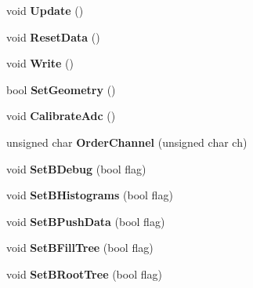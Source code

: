 \begin{DoxyCompactItemize}
\item 
\hypertarget{classCalibrator_a222509c611b01d1a77d0660973871067}{void {\bfseries Update} ()}\label{classCalibrator_a222509c611b01d1a77d0660973871067}

\item 
\hypertarget{classCalibrator_adc2c0c66462d79f9de57d4284ef3fd8d}{void {\bfseries Reset\-Data} ()}\label{classCalibrator_adc2c0c66462d79f9de57d4284ef3fd8d}

\item 
\hypertarget{classCalibrator_aa9d8bfddbfb414a3a6586d6a04558aa0}{void {\bfseries Write} ()}\label{classCalibrator_aa9d8bfddbfb414a3a6586d6a04558aa0}

\item 
\hypertarget{classCalibrator_a5ca3cd459c250b46dee500339a5c72a3}{bool {\bfseries Set\-Geometry} ()}\label{classCalibrator_a5ca3cd459c250b46dee500339a5c72a3}

\item 
\hypertarget{classCalibrator_a3c16fdddcd8b5d2fb8539f9e51bfed5f}{void {\bfseries Calibrate\-Adc} ()}\label{classCalibrator_a3c16fdddcd8b5d2fb8539f9e51bfed5f}

\item 
\hypertarget{classCalibrator_a0cccbffc2a642c0b6c3790ac5e34f8f6}{unsigned char {\bfseries Order\-Channel} (unsigned char ch)}\label{classCalibrator_a0cccbffc2a642c0b6c3790ac5e34f8f6}

\item 
\hypertarget{classCalibrator_abc0a8e802a2bdb8ab4a95d85fd727a1f}{void {\bfseries Set\-B\-Debug} (bool flag)}\label{classCalibrator_abc0a8e802a2bdb8ab4a95d85fd727a1f}

\item 
\hypertarget{classCalibrator_a4874bd9780af8d6e665679231a6e2725}{void {\bfseries Set\-B\-Histograms} (bool flag)}\label{classCalibrator_a4874bd9780af8d6e665679231a6e2725}

\item 
\hypertarget{classCalibrator_a3fd0dfe92d0d15a964fa9be62afbb88d}{void {\bfseries Set\-B\-Push\-Data} (bool flag)}\label{classCalibrator_a3fd0dfe92d0d15a964fa9be62afbb88d}

\item 
\hypertarget{classCalibrator_af93c3bc7acba890e2b04632b667b8fba}{void {\bfseries Set\-B\-Fill\-Tree} (bool flag)}\label{classCalibrator_af93c3bc7acba890e2b04632b667b8fba}

\item 
\hypertarget{classCalibrator_aee5b22633be8a416c8b6af3181f45465}{void {\bfseries Set\-B\-Root\-Tree} (bool flag)}\label{classCalibrator_aee5b22633be8a416c8b6af3181f45465}


\end{DoxyCompactItemize}
